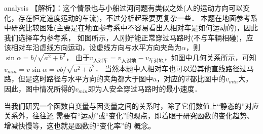 \begin{example}
\begin{taggedblock}{analysis}
		【解析】：这个情景也与小船过河问题有类似之处(人的运动方向可以变化，存在恒定速度运动的车流)，不过分析起采要更复杂一些．
		本题在地面参考系中研究比较困难(主要是在地面参考系中不容易看出人相对车是如何运动的)，因此我们选择车为参考系，
		如图所示，人刚好能正常穿过马路时(不与车辆相碰)，应该相对车沿虚线方向运动，设虚线方向与水平方向夹角为$ \alpha $，则$ \sin\alpha=b/\sqrt{a^2+b^2} $，
		由于$v_{\text{人对车}}=v_{\text{人对地}}-v_{\text{车对地}}$，如图中几何关系所示，可知$v_{min}=v\sin\alpha=vb/\sqrt{a^2+b^2} $．
		当然本题中人相对车也可以沿其他直线路径过马路，但是这时路径与水平方向的夹角都大于图中a，对应的$ \vec{v} $都比图中的$ v_{min} $大，因此，图中情况所得的$ v_{min} $即为人安全穿过马路时的最小速度．

		
	\end{taggedblock}
\end{example}



当我们研究一个函数自变量与因变量之间的关系时，除了它们数值上“静态的”对应关系外，往往还
需要有“运动”或“变化”的观点，即着眼于研究函数的变化趋势、增减快慢等，这也就是函数的“变化率”的
概念。



